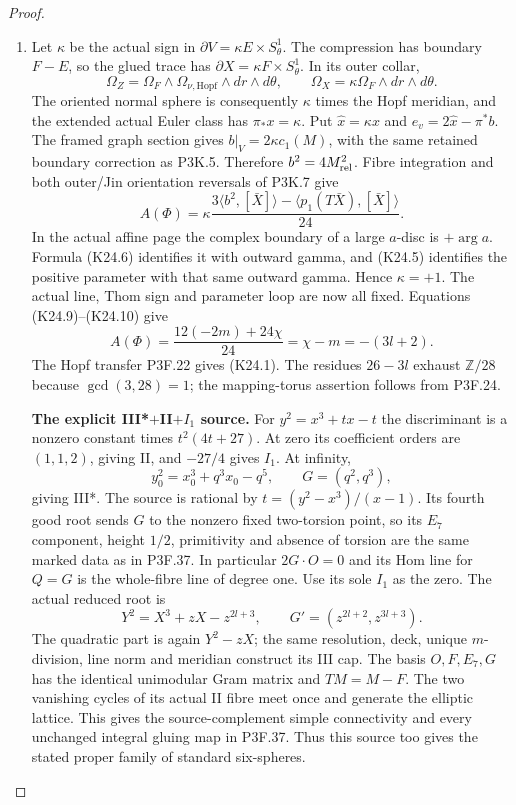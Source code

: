 \begin{proof}
\begin{enumerate}[label=\arabic*.]
\item Let $\kappa$ be the actual sign in
$\partial V=\kappa E\times S^1_\theta$. The compression
has boundary $F-E$, so the glued trace has
$\partial X=\kappa F\times S^1_\theta$. In its outer collar,
\[
 \Omega_Z=\Omega_F\wedge\Omega_{\nu,\mathrm{Hopf}}
                  \wedge dr\wedge d\theta,
 \qquad
 \Omega_X=\kappa\Omega_F\wedge dr\wedge d\theta.
\]
The oriented normal sphere is consequently $\kappa$ times
the Hopf meridian, and the extended actual Euler class has
$\pi_*x=\kappa$. Put $\widehat x=\kappa x$ and
$e_v=2\widehat x-\pi^*b$. The framed graph section gives
$b|_V=2\kappa c_1(M)$, with the same retained boundary
correction as P3K.5. Therefore $b^2=4M_{\rm rel}^2$.
Fibre integration and both outer/Jin orientation reversals
of P3K.7 give
\[
 A(\Phi)=\kappa\frac{3\langle b^2,[\bar X]\rangle
                   -\langle p_1(T\bar X),[\bar X]\rangle}{24}.
                                                               \tag{K24.10}
\]
In the actual affine page the complex boundary of a large
$a$-disc is $+\arg a$. Formula (K24.6) identifies it with
outward gamma, and (K24.5) identifies the positive parameter
with that same outward gamma. Hence $\kappa=+1$. The actual
line, Thom sign and parameter loop are now all fixed. Equations
(K24.9)--(K24.10) give
\[
 A(\Phi)=\frac{12(-2m)+24\chi}{24}
        =\chi-m=-(3l+2).
\]
The Hopf transfer P3F.22 gives (K24.1). The residues
$26-3l$ exhaust $\mathbb Z/28$ because $\gcd(3,28)=1$;
the mapping-torus assertion follows from P3F.24.

\par\medskip\noindent\textbf{The explicit III*$+$II$+I_1$ source.}
For $y^2=x^3+tx-t$ the discriminant is a nonzero constant
times $t^2(4t+27)$. At zero its coefficient orders are
$(1,1,2)$, giving II, and $-27/4$ gives $I_1$. At infinity,
\[
 y_0^2=x_0^3+q^3x_0-q^5,\qquad G=(q^2,q^3),
\]
giving III*. The source is rational by
$t=(y^2-x^3)/(x-1)$. Its fourth good root sends $G$ to the
nonzero fixed two-torsion point, so its $E_7$ component,
height $1/2$, primitivity and absence of torsion are the same
marked data as in P3F.37. In particular $2G\cdot O=0$ and
its Hom line for $Q=G$ is the whole-fibre line of degree one.
Use its sole $I_1$ as the zero. The actual reduced root is
\[
 Y^2=X^3+zX-z^{2l+3},\qquad
 G'=(z^{2l+2},z^{3l+3}).
\]
The quadratic part is again $Y^2-zX$; the same resolution,
deck, unique $m$-division, line norm and meridian construct its
III cap. The basis $O,F,E_7,G$ has the identical unimodular
Gram matrix and $TM=M-F$. The two vanishing cycles of its
actual II fibre meet once and generate the elliptic lattice.
This gives the source-complement simple connectivity and every
unchanged integral gluing map in P3F.37. Thus this source too
gives the stated proper family of standard six-spheres.


\end{enumerate}
\end{proof}
